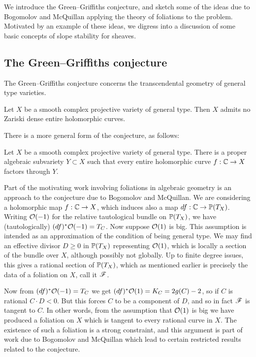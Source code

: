 
We introduce the Green--Griffiths conjecture, and sketch some of the ideas due
to Bogomolov and McQuillan applying the theory of foliations to the problem.
Motivated by an example of these ideas, we digress into a discussion of some
basic concepts of slope stability for sheaves.

\subsection{The Green--Griffiths conjecture}

The Green--Griffiths conjecture concerns the transcendental geometry of general
type varieties.

\begin{conjecture}
    Let $X$ be a smooth complex projective variety of general type. Then $X$
    admits no Zariski dense entire holomorphic curves.
\end{conjecture}

There is a more general form of the conjecture, as follows:

\begin{conjecture}
    Let $X$ be a smooth complex projective variety of general type. There is a
    proper algebraic subvariety $Y\subset X$ such that every entire holomorphic
    curve $f:\C\to X$ factors through $Y$.
\end{conjecture}

Part of the motivating work involving foliations in algebraic geometry is an
approach to the conjecture due to Bogomolov and McQuillan. We are considering a
holomorphic map $f:\C\to X$, which induces also a map $df:\C\to\P(T_X)$. Writing
$\O(-1)$ for the relative tautological bundle on $\P(T_X)$, we have
(tautologically) $(df)^*\O(-1)=T_C$. Now suppose $\O(1)$ is big. This assumption
is intended as an approximation of the condition of being general type. We may
find an effective divisor $D\ge0$ in $\P(T_X)$ representing $\O(1)$, which is
locally a section of the bundle over $X$, although possibly not globally. Up to
finite degree issues, this gives a rational section of $\P(T_X)$, which as
mentioned earlier is precisely the data of a foliation on $X$, call it $\scrF$.

Now from $(df)^*\O(-1)=T_C$ we get $(df)^*\O(1)=K_C=2g(C)-2$, so if $C$ is
rational $C\cdot D<0$. But this forces $C$ to be a component of $D$, and so in
fact $\scrF$ is tangent to $C$. %
In other words, from the assumption that $\O(1)$ is big we have produced a
foliation on $X$ which is tangent to every rational curve in $X$. The existence
of such a foliation is a strong constraint, and this argument is part of work
due to Bogomolov and McQuillan \cite{mcquillan_98} which lead to certain
restricted results related to the conjecture.

